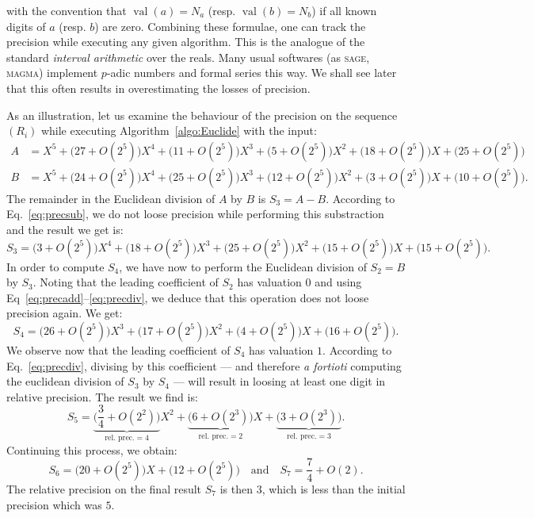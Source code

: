 \documentclass{article}
\DeclareMathOperator{\val}{val}
\begin{document}

\noindent
with the convention that $\val(a) = N_a$ (resp. $\val(b) = N_b$) if all
known digits of $a$ (resp. $b$) are zero.
Combining these formulae, one can track the precision while executing 
any given algorithm. This is the analogue of the standard \emph{interval 
arithmetic} over the reals. Many usual softwares (as \textsc{sage}, 
\textsc{magma}) implement $p$-adic numbers and formal series this way. 
We shall see later that this often results in overestimating the losses 
of precision.

\begin{ex}
\label{ex:Euclide}
As an illustration, let us examine the behaviour of the precision
on the sequence $(R_i)$ while executing Algorithm~\ref{algo:Euclide} 
with the input:
\begin{align*}
A & = X^5 + 
      \big(27 + O(2^5)\big) X^4 +
      \big(11 + O(2^5)\big) X^3 +
      \big(5 + O(2^5)\big) X^2 +
      \big(18 + O(2^5)\big) X +
      \big(25 + O(2^5)\big) \\
B & = X^5 + 
      \big(24 + O(2^5)\big) X^4 +
      \big(25 + O(2^5)\big) X^3 +
      \big(12 + O(2^5)\big) X^2 +
      \big(3 + O(2^5)\big) X +
      \big(10 + O(2^5)\big).
\end{align*}
The remainder in the Euclidean division of $A$ by $B$ is $S_3 = A-B$.
According to Eq.~\eqref{eq:precsub},
we do not loose precision while performing this substraction and the
result we get is:
$$S_3 = 
      \big(3 + O(2^5)\big) X^4 +
      \big(18 + O(2^5)\big) X^3 +
      \big(25 + O(2^5)\big) X^2 +
      \big(15 + O(2^5)\big) X +
      \big(15 + O(2^5)\big).$$ 
In order to compute $S_4$, we have now to perform the Euclidean division 
of $S_2 = B$ by $S_3$. Noting that the leading coefficient of $S_2$ has 
valuation $0$ and using Eq~\eqref{eq:precadd}--\eqref{eq:precdiv}, we 
deduce that this operation does not loose precision again. We get:
$$S_4 = 
      \big(26 + O(2^5)\big) X^3 +
      \big(17 + O(2^5)\big) X^2 +
      \big(4 + O(2^5)\big) X +
      \big(16 + O(2^5)\big).$$
We observe now that the leading coefficient of $S_4$ has valuation $1$. 
According to Eq.~\eqref{eq:precdiv}, divising by this coefficient ---
and therefore \emph{a fortioti} computing the euclidean division of 
$S_3$ by $S_4$ --- will result in loosing at least one digit in
relative precision. The result we find is:
$$S_5 = 
      \underbrace{\big(\textstyle \frac 3 4 + O(2^2)\big)}_{\text{rel. prec.} = 4} X^2 +
      \underbrace{\big(6 + O(2^3)\big)}_{\text{rel. prec.} = 2} X +
      \underbrace{\big(3 + O(2^3)\big)}_{\text{rel. prec.} = 3}.$$
Continuing this process, we obtain:
$$S_6 = 
      \big(20 + O(2^5)\big) X +
      \big(12 + O(2^5)\big) 
\quad \text{and} \quad
S_7 =
      \textstyle \frac 7 4 + O(2).$$
The relative precision on the final result $S_7$ is then $3$, which is
less than the initial precision which was $5$.
\end{ex}
\end{document}
